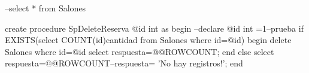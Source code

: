 --select * from Salones

create procedure SpDeleteReserva
@id int 
as
begin 
--declare @id int =1--prueba 
if EXISTS(select COUNT(id)cantidad from Salones where id=@id)
	begin
	delete Salones where id=@id 
	select respuesta=@@ROWCOUNT; 
	end
else 
	select respuesta=@@ROWCOUNT--respuesta= 'No hay registros!';
end